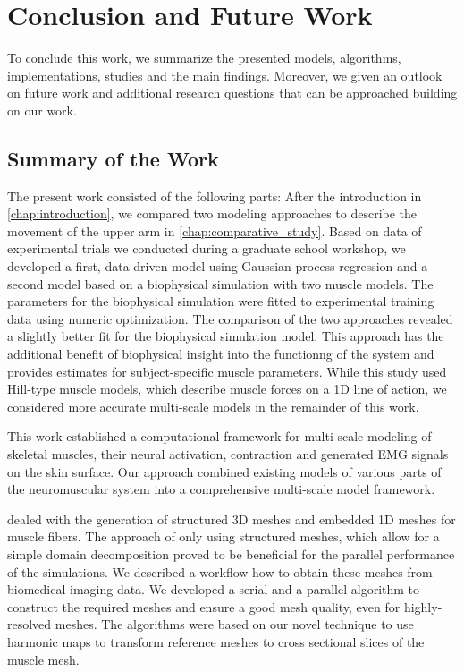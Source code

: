 
\chapter{Conclusion and Future Work}\label{sec:conclusion_and_future_work}
To conclude this work, we summarize the presented models, algorithms, implementations, studies and the main findings. Moreover, we given an outlook on future work and additional research questions that can be approached building on our work.

\section{Summary of the Work}

The present work consisted of the following parts: After the introduction in \cref{chap:introduction}, we compared two modeling approaches to describe the movement of the upper arm in \cref{chap:comparative_study}. Based on data of experimental trials we conducted during a graduate school workshop, we developed a first, data-driven model using Gaussian process regression and a second model based on a biophysical simulation with two muscle models. The parameters for the biophysical simulation were fitted to experimental training data using numeric optimization. The comparison of the two approaches revealed a slightly better fit for the biophysical simulation model. This approach has the additional benefit of biophysical insight into the functionng of the system and provides estimates for subject-specific muscle parameters. While this study used Hill-type muscle models, which describe muscle forces on a 1D line of action, we considered more accurate multi-scale models in the remainder of this work.

This work established a computational framework for multi-scale modeling of skeletal muscles, their neural activation, contraction and generated EMG signals on the skin surface. Our approach combined existing models of various parts of the neuromuscular system into a comprehensive multi-scale model framework.

 dealed with the generation of structured 3D meshes and embedded 1D meshes for muscle fibers. The approach of only using structured meshes, which allow for a simple domain decomposition proved to be beneficial for the parallel performance of the simulations.  
We described a workflow how to obtain these meshes from biomedical imaging data. We developed a serial and a parallel algorithm to construct the required meshes and ensure a good mesh quality, even for highly-resolved meshes. The algorithms were based on our novel technique to use harmonic maps to transform reference meshes to cross sectional slices of the muscle mesh.

